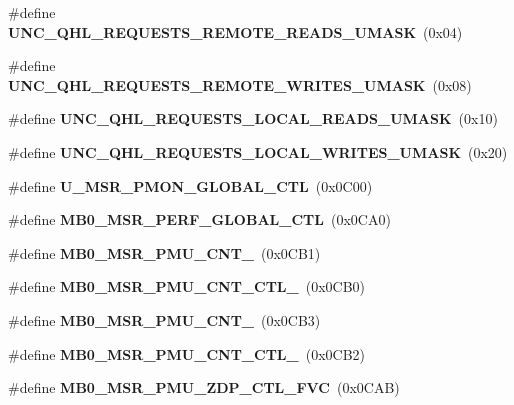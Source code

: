 \begin{DoxyCompactItemize}
\item 
\#define {\bfseries U\+N\+C\+\_\+\+Q\+H\+L\+\_\+\+R\+E\+Q\+U\+E\+S\+T\+S\+\_\+\+R\+E\+M\+O\+T\+E\+\_\+\+R\+E\+A\+D\+S\+\_\+\+U\+M\+A\+S\+K}~(0x04)\label{types_8h_a03ea6ce36511244b92f7f28133fddf2d}

\item 
\#define {\bfseries U\+N\+C\+\_\+\+Q\+H\+L\+\_\+\+R\+E\+Q\+U\+E\+S\+T\+S\+\_\+\+R\+E\+M\+O\+T\+E\+\_\+\+W\+R\+I\+T\+E\+S\+\_\+\+U\+M\+A\+S\+K}~(0x08)\label{types_8h_ab0077e2742a89d3f5062e758ad3bea32}

\item 
\#define {\bfseries U\+N\+C\+\_\+\+Q\+H\+L\+\_\+\+R\+E\+Q\+U\+E\+S\+T\+S\+\_\+\+L\+O\+C\+A\+L\+\_\+\+R\+E\+A\+D\+S\+\_\+\+U\+M\+A\+S\+K}~(0x10)\label{types_8h_aa49807e82cc1bb3a4f4d183ca67f3d07}

\item 
\#define {\bfseries U\+N\+C\+\_\+\+Q\+H\+L\+\_\+\+R\+E\+Q\+U\+E\+S\+T\+S\+\_\+\+L\+O\+C\+A\+L\+\_\+\+W\+R\+I\+T\+E\+S\+\_\+\+U\+M\+A\+S\+K}~(0x20)\label{types_8h_a03c56b60d268ae31c7d5c3186dd9eca1}

\item 
\#define {\bfseries U\+\_\+\+M\+S\+R\+\_\+\+P\+M\+O\+N\+\_\+\+G\+L\+O\+B\+A\+L\+\_\+\+C\+T\+L}~(0x0\+C00)\label{types_8h_a1c69439681fa91a8823350ce9ad91262}

\item 
\#define {\bfseries M\+B0\+\_\+\+M\+S\+R\+\_\+\+P\+E\+R\+F\+\_\+\+G\+L\+O\+B\+A\+L\+\_\+\+C\+T\+L}~(0x0\+C\+A0)\label{types_8h_a00d8e56a55456b4f7eaa0721e3a92554}

\item 
\#define {\bfseries M\+B0\+\_\+\+M\+S\+R\+\_\+\+P\+M\+U\+\_\+\+C\+N\+T\+\_}~(0x0\+C\+B1)\label{types_8h_af5040cf21905f48c937b0136ec430913}

\item 
\#define {\bfseries M\+B0\+\_\+\+M\+S\+R\+\_\+\+P\+M\+U\+\_\+\+C\+N\+T\+\_\+\+C\+T\+L\+\_}~(0x0\+C\+B0)\label{types_8h_ae4a0e1983c4493471b78c7b3d4bc7f46}

\item 
\#define {\bfseries M\+B0\+\_\+\+M\+S\+R\+\_\+\+P\+M\+U\+\_\+\+C\+N\+T\+\_}~(0x0\+C\+B3)\label{types_8h_a0df6e3fab87e53401d50c45c4555974c}

\item 
\#define {\bfseries M\+B0\+\_\+\+M\+S\+R\+\_\+\+P\+M\+U\+\_\+\+C\+N\+T\+\_\+\+C\+T\+L\+\_}~(0x0\+C\+B2)\label{types_8h_ae39dc86d20e7a32716317b09034a3f15}

\item 
\#define {\bfseries M\+B0\+\_\+\+M\+S\+R\+\_\+\+P\+M\+U\+\_\+\+Z\+D\+P\+\_\+\+C\+T\+L\+\_\+\+F\+V\+C}~(0x0\+C\+A\+B)\label{types_8h_a53e14a771731731a3f3a860c4eef80f7}


\end{DoxyCompactItemize}
